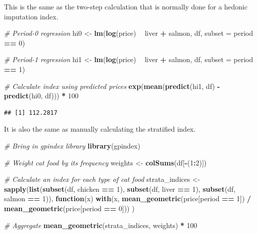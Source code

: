 \documentclass[]{article}
\newenvironment{Shaded}{\begin{snugshade}}{\end{snugshade}}
\newcommand{\CommentTok}[1]{\textcolor[rgb]{0.56,0.35,0.01}{\textit{#1}}}
\newcommand{\ControlFlowTok}[1]{\textcolor[rgb]{0.13,0.29,0.53}{\textbf{#1}}}
\newcommand{\DataTypeTok}[1]{\textcolor[rgb]{0.13,0.29,0.53}{#1}}
\newcommand{\DecValTok}[1]{\textcolor[rgb]{0.00,0.00,0.81}{#1}}
\newcommand{\KeywordTok}[1]{\textcolor[rgb]{0.13,0.29,0.53}{\textbf{#1}}}
\newcommand{\NormalTok}[1]{#1}
\newcommand{\OperatorTok}[1]{\textcolor[rgb]{0.81,0.36,0.00}{\textbf{#1}}}
\newcommand{\StringTok}[1]{\textcolor[rgb]{0.31,0.60,0.02}{#1}}
\begin{document}
This is the same as the two-step calculation that is normally done for a hedonic imputation index.

\begin{Shaded}
\begin{Highlighting}[]
\CommentTok{# Period-0 regression}
\NormalTok{hi0 <-}\StringTok{ }\KeywordTok{lm}\NormalTok{(}\KeywordTok{log}\NormalTok{(price) }\OperatorTok{~}\StringTok{ }\NormalTok{liver }\OperatorTok{+}\StringTok{ }\NormalTok{salmon, df, }\DataTypeTok{subset =}\NormalTok{ period }\OperatorTok{==}\StringTok{ }\DecValTok{0}\NormalTok{)}

\CommentTok{# Period-1 regression}
\NormalTok{hi1 <-}\StringTok{ }\KeywordTok{lm}\NormalTok{(}\KeywordTok{log}\NormalTok{(price) }\OperatorTok{~}\StringTok{ }\NormalTok{liver }\OperatorTok{+}\StringTok{ }\NormalTok{salmon, df, }\DataTypeTok{subset =}\NormalTok{ period }\OperatorTok{==}\StringTok{ }\DecValTok{1}\NormalTok{)}

\CommentTok{# Calculate index using predicted prices}
\KeywordTok{exp}\NormalTok{(}\KeywordTok{mean}\NormalTok{(}\KeywordTok{predict}\NormalTok{(hi1, df) }\OperatorTok{-}\StringTok{ }\KeywordTok{predict}\NormalTok{(hi0, df))) }\OperatorTok{*}\StringTok{ }\DecValTok{100}
\end{Highlighting}
\end{Shaded}

\begin{verbatim}
## [1] 112.2817
\end{verbatim}

It is also the same as manually calculating the stratified index.

\begin{Shaded}
\begin{Highlighting}[]
\CommentTok{# Bring in gpindex library}
\KeywordTok{library}\NormalTok{(gpindex)}

\CommentTok{# Weight cat food by its frequency}
\NormalTok{weights <-}\StringTok{ }\KeywordTok{colSums}\NormalTok{(df[}\OperatorTok{-}\NormalTok{(}\DecValTok{1}\OperatorTok{:}\DecValTok{2}\NormalTok{)])}

\CommentTok{# Calculate an index for each type of cat food}
\NormalTok{strata_indices <-}\StringTok{ }
\StringTok{  }\KeywordTok{sapply}\NormalTok{(}\KeywordTok{list}\NormalTok{(}\KeywordTok{subset}\NormalTok{(df, chicken }\OperatorTok{==}\StringTok{ }\DecValTok{1}\NormalTok{), }
              \KeywordTok{subset}\NormalTok{(df, liver }\OperatorTok{==}\StringTok{ }\DecValTok{1}\NormalTok{), }
              \KeywordTok{subset}\NormalTok{(df, salmon }\OperatorTok{==}\StringTok{ }\DecValTok{1}\NormalTok{)),}
         \ControlFlowTok{function}\NormalTok{(x) }\KeywordTok{with}\NormalTok{(x, }\KeywordTok{mean_geometric}\NormalTok{(price[period }\OperatorTok{==}\StringTok{ }\DecValTok{1}\NormalTok{]) }\OperatorTok{/}\StringTok{ }\KeywordTok{mean_geometric}\NormalTok{(price[period }\OperatorTok{==}\StringTok{ }\DecValTok{0}\NormalTok{]))}
\NormalTok{         )}

\CommentTok{# Aggregate}
\KeywordTok{mean_geometric}\NormalTok{(strata_indices, weights) }\OperatorTok{*}\StringTok{ }\DecValTok{100}
\end{Highlighting}
\end{Shaded}
\end{document}
